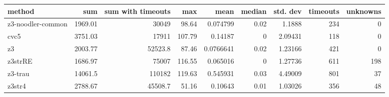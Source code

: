 \begin{tabular}{lrrrrrrrr}
\hline
 method            &      sum &   sum with timeouts &    max &      mean &   median &   std. dev &   timeouts &   unknowns \\
\hline
 z3-noodler-common &  1969.01 &             30049   &  98.64 & 0.074799  &     0.02 &    1.1888  &        234 &          0 \\
 cvc5              &  3751.03 &             17911   & 107.79 & 0.14187   &     0    &    2.09431 &        118 &          0 \\
 z3                &  2003.77 &             52523.8 &  87.46 & 0.0766641 &     0.02 &    1.23166 &        421 &          0 \\
 z3strRE           &  1686.97 &             75007   & 116.55 & 0.065016  &     0    &    1.27736 &        611 &        198 \\
 z3-trau           & 14061.5  &            110182   & 119.63 & 0.545931  &     0.03 &    4.49009 &        801 &         37 \\
 z3str4            &  2788.67 &             45508.7 &  51.16 & 0.10643   &     0.01 &    1.03026 &        356 &         48 \\
\hline
\end{tabular}
